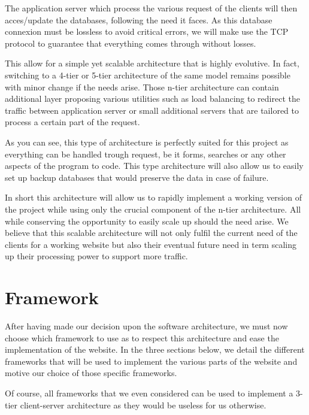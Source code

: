 The application server which process the various request of the clients will then acces/update the databases, following the need it faces. As this database connexion must be lossless to avoid critical errors, we will make use the TCP protocol to guarantee that everything comes through without losses. \newline

This allow for a simple yet scalable architecture that is highly evolutive. In fact, switching to a 4-tier or 5-tier architecture of the same model remains possible with minor change if the needs arise. Those n-tier architecture can contain additional layer proposing various utilities such as load balancing to redirect the traffic between application server or small additional servers that are tailored to process a certain part of the request. \newline

As you can see, this type of architecture is perfectly suited for this project as everything can be handled trough request, be it forms, searches or any other aspects of the program to code. This type architecture will also allow us to easily set up backup databases that would preserve the data in case of failure. \newline

In short this architecture will allow us to rapidly implement a working version of the project while using only the crucial component of the n-tier architecture. All while conserving the opportunity to easily scale up should the need arise. We believe that this scalable architecture will not only fulfil the current need of the clients for a working website but also their eventual future need in term scaling up their processing power to support more traffic.

\section{Framework}

After having made our decision upon the software architecture, we must now choose which framework to use as to respect this architecture and ease the implementation of the website. In the three sections below, we detail the different frameworks that will be used to implement the various parts of the website and motive our choice of those specific frameworks. \newline

Of course, all frameworks that we even considered can be used to implement a 3-tier client-server architecture as they would be useless for us otherwise.

